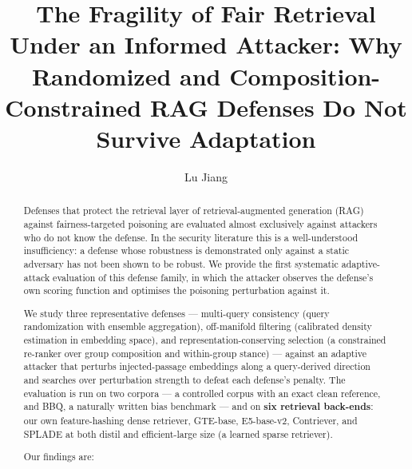 \documentclass[review,3p,times]{elsarticle}
\begin{document}
\title{The Fragility of Fair Retrieval Under an Informed Attacker: Why Randomized and Composition-Constrained RAG Defenses Do Not Survive Adaptation}
\author[njust]{Lu Jiang}
\date{}
\maketitle



\begin{abstract}

Defenses that protect the retrieval layer of retrieval-augmented generation (RAG) against fairness-targeted poisoning are evaluated almost exclusively against attackers who do not know the defense. In the security literature this is a well-understood insufficiency: a defense whose robustness is demonstrated only against a static adversary has not been shown to be robust. We provide the first systematic adaptive-attack evaluation of this defense family, in which the attacker observes the defense's own scoring function and optimises the poisoning perturbation against it.

We study three representative defenses --- multi-query consistency (query randomization with ensemble aggregation), off-manifold filtering (calibrated density estimation in embedding space), and representation-conserving selection (a constrained re-ranker over group composition and within-group stance) --- against an adaptive attacker that perturbs injected-passage embeddings along a query-derived direction and searches over perturbation strength to defeat each defense's penalty. The evaluation is run on two corpora --- a controlled corpus with an exact clean reference, and BBQ, a naturally written bias benchmark --- and on \textbf{six retrieval back-ends}: our own feature-hashing dense retriever, GTE-base, E5-base-v2, Contriever, and SPLADE at both distil and efficient-large size (a learned sparse retriever).

Our findings are:


\end{abstract}
\end{document}

